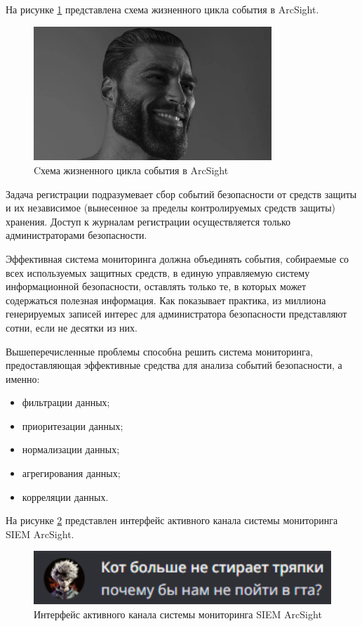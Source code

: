 На рисунке \ref{life_cycle} представлена схема жизненного цикла события в ArcSight.
\begin{figure}[H]
  \centering
  \includegraphics[width=0.8\textwidth]{resources/10.jpg}
  \caption{Cхема жизненного цикла события в ArcSight}
  \label{life_cycle}
\end{figure}

Задача регистрации подразумевает сбор событий безопасности от средств защиты и их независимое (вынесенное за пределы контролируемых средств защиты) хранения. Доступ к журналам регистрации осуществляется только администраторами безопасности.

Эффективная система мониторинга должна объединять события, собираемые со всех используемых защитных средств, в единую управляемую систему информационной безопасности, оставлять только те, в которых может содержаться полезная информация. Как показывает практика, из миллиона генерируемых записей интерес для администратора безопасности представляют сотни, если не десятки из них.

Вышеперечисленные проблемы способна решить система мониторинга, предоставляющая эффективные средства для анализа событий безопасности, а именно:
\begin{itemize}
    \item фильтрации данных;
    \item приоритезации данных;
    \item нормализации данных;
    \item агрегирования данных;
    \item корреляции данных.
\end{itemize}


На рисунке \ref{ArcSightMon} представлен интерфейс активного канала системы мониторинга SIEM ArcSight.

\begin{figure}[H]
  \centering
  \includegraphics[width=1\textwidth]{resources/11.png}
  \caption{Интерфейс активного канала системы мониторинга SIEM ArcSight}
  \label{ArcSightMon}
\end{figure}

